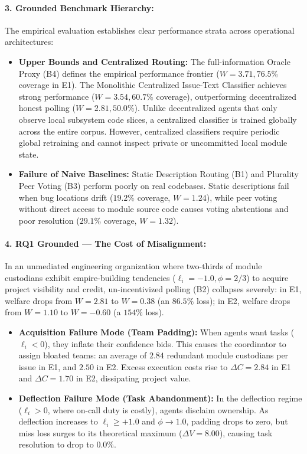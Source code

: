 \documentclass{article}
\theoremstyle{definition}
\begin{document}
\paragraph{3. Grounded Benchmark Hierarchy:}
The empirical evaluation establishes clear performance strata across operational architectures:
\begin{itemize}
    \item \textbf{Upper Bounds and Centralized Routing:} The full-information Oracle Proxy (B4) defines the empirical performance frontier ($W = 3.71, 76.5\%$ coverage in E1). The Monolithic Centralized Issue-Text Classifier achieves strong performance ($W = 3.54, 60.7\%$ coverage), outperforming decentralized honest polling ($W = 2.81, 50.0\%$). Unlike decentralized agents that only observe local subsystem code slices, a centralized classifier is trained globally across the entire corpus. However, centralized classifiers require periodic global retraining and cannot inspect private or uncommitted local module state.
    \item \textbf{Failure of Naive Baselines:} Static Description Routing (B1) and Plurality Peer Voting (B3) perform poorly on real codebases. Static descriptions fail when bug locations drift ($19.2\%$ coverage, $W = 1.24$), while peer voting without direct access to module source code causes voting abstentions and poor resolution ($29.1\%$ coverage, $W = 1.32$).
\end{itemize}

\paragraph{4. RQ1 Grounded — The Cost of Misalignment:}
In an unmediated engineering organization where two-thirds of module custodians exhibit empire-building tendencies ($\ell_i = -1.0, \phi = 2/3$) to acquire project visibility and credit, un-incentivized polling (B2) collapses severely: in E1, welfare drops from $W = 2.81$ to $W = 0.38$ (an $86.5\%$ loss); in E2, welfare drops from $W = 1.10$ to $W = -0.60$ (a $154\%$ loss).
\begin{itemize}
    \item \textbf{Acquisition Failure Mode (Team Padding):} When agents want tasks ($\ell_i < 0$), they inflate their confidence bids. This causes the coordinator to assign bloated teams: an average of $2.84$ redundant module custodians per issue in E1, and $2.50$ in E2. Excess execution costs rise to $\Delta C = 2.84$ in E1 and $\Delta C = 1.70$ in E2, dissipating project value.
    \item \textbf{Deflection Failure Mode (Task Abandonment):} In the deflection regime ($\ell_i > 0$, where on-call duty is costly), agents disclaim ownership. As deflection increases to $\ell_i \ge +1.0$ and $\phi \to 1.0$, padding drops to zero, but miss loss surges to its theoretical maximum ($\Delta V = 8.00$), causing task resolution to drop to $0.0\%$.
\end{itemize}
\end{document}
